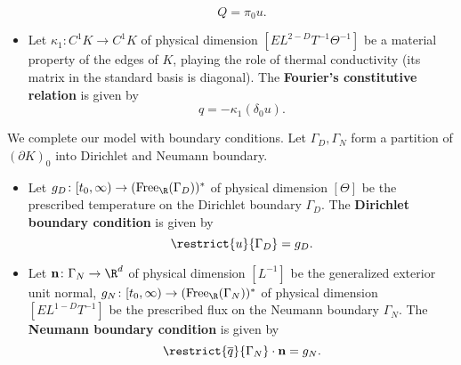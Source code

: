 \begin{discussion}
\begin{itemize}
      \begin{equation}
        Q = \pi_0 u.
      \end{equation}
    \item
      Let $\kappa_1 \colon C^1 K \to C^1 K$
      of physical dimension $[E L^{2 - D} T^{-1} \Theta^{-1}]$
      be a material property of the edges of $K$,
      playing the role of thermal conductivity
      (its matrix in the standard basis is diagonal).
      The \textbf{Fourier's constitutive relation} is given by
      \begin{equation}
        q = - \kappa_1 (\delta_0 u).
      \end{equation}
  \end{itemize}
  We complete our model with boundary conditions.
  Let $\Gamma_D, \Gamma_N$ form a partition of $(\partial K)_0$
  into Dirichlet and Neumann boundary.
  \begin{itemize}
    \item
      Let $g_D \colon [t_0, \infty) \to ({\rm Free}_\R(\Gamma_D))^*$
      of physical dimension $[\Theta]$
      be the prescribed temperature on the Dirichlet boundary $\Gamma_D$.
      The \textbf{Dirichlet boundary condition} is given by
      \begin{equation}
        \restrict{u}{\Gamma_D} = g_D.
      \end{equation}
    \item
      Let
        ${\bf n} \colon \Gamma_N \to \R^d$
          of physical dimension $[L^{-1}]$
          be the generalized exterior unit normal,
        $g_N \colon [t_0, \infty) \to ({\rm Free}_\R(\Gamma_N))^*$
          of physical dimension $[E L^{1 - D} T^{-1}]$
          be the prescribed flux on the Neumann boundary $\Gamma_N$.
      The \textbf{Neumann boundary condition} is given by
      \begin{equation}
        \restrict{\overline{q}}{\Gamma_N} \cdot {\bf n} = g_N.
      \end{equation}
  \end{itemize}
\end{discussion}
